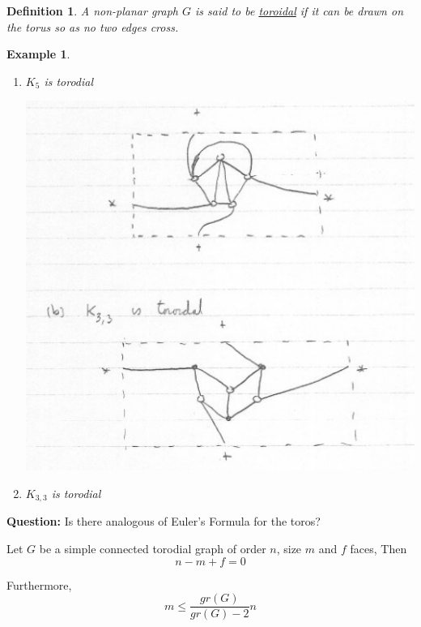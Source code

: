 \documentclass[12pt]{article}
\newenvironment{theorem}[1]{%
  \renewcommand\themanualtheoreminner{#1}%
  \manualtheoreminner
}{\endmanualtheoreminner}
\newtheorem{example}{Example}
\newtheorem{definition}{Definition}
\begin{document}
\begin{definition}
A non-planar graph $G$ is said to be \underline{toroidal} if it can be drawn on the torus so as no two edges cross.
\end{definition}


\begin{example}
  \begin{enumerate}
    \item $K_{5}$ is torodial

          \begin{center}
            \includegraphics[scale=0.5]{torodial}
          \end{center}

    \item $K_{3,3}$ is torodial

  \end{enumerate}

\end{example}


\textbf{Question:} Is there analogous of Euler's Formula for the toros?


\begin{theorem}{7}
  Let $G$ be a simple connected torodial graph of order $n$, size $m$ and $f$ faces, Then
  \[n - m + f = 0\]

  Furthermore,
  \[m \le \frac{gr(G)}{gr(G) - 2} n\]
\end{theorem}
\end{document}
